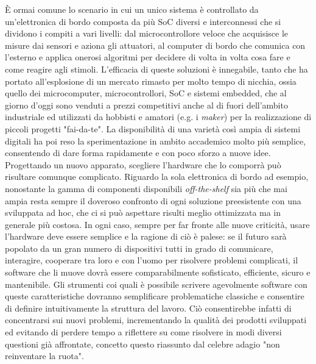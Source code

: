 È ormai comune lo scenario in cui un unico sistema è controllato da un'elettronica di bordo composta da più SoC diversi e interconnessi che si dividono i compiti a vari livelli: dal microcontrollore veloce che acquisisce le misure dai sensori e aziona gli attuatori, al computer di bordo che comunica con l'esterno e applica onerosi algoritmi per decidere di volta in volta cosa fare e come reagire agli stimoli. L'efficacia di queste soluzioni è innegabile, tanto che ha portato all'esplosione di un mercato rimasto per molto tempo di nicchia, ossia quello dei microcomputer, microcontrollori, SoC e sistemi embedded, che al giorno d'oggi sono venduti a prezzi competitivi anche al di fuori dell'ambito industriale ed utilizzati da hobbisti e amatori (e.g. i \emph{maker}) per la realizzazione di piccoli progetti "fai-da-te". La disponibilità di una varietà così ampia di sistemi digitali ha poi reso la sperimentazione in ambito accademico molto più semplice, consentendo di dare forma rapidamente e con poco sforzo a nuove idee.\\
Progettando un nuovo apparato, scegliere l'hardware che lo comporrà può risultare comunque complicato. Riguardo la sola elettronica di bordo ad esempio, nonostante la gamma di componenti disponibili \emph{off-the-shelf} sia più che mai ampia resta sempre il doveroso confronto di ogni soluzione preesistente con una sviluppata ad hoc, che ci si può aspettare risulti meglio ottimizzata ma in generale più costosa. In ogni caso, sempre per far fronte alle nuove criticità, usare l'hardware deve essere semplice e la ragione di ciò è palese: se il futuro sarà popolato da un gran numero di dispositivi tutti in grado di comunicare, interagire, cooperare tra loro e con l'uomo per risolvere problemi complicati, il software che li muove dovrà essere comparabilmente sofisticato, efficiente, sicuro e mantenibile. Gli strumenti coi quali è possibile scrivere agevolmente software con queste caratteristiche dovranno semplificare problematiche classiche e consentire di definire intuitivamente la struttura del lavoro. Ciò consentirebbe infatti di concentrarsi sui nuovi problemi, incrementando la qualità dei prodotti sviluppati ed evitando di perdere tempo a riflettere su come risolvere in modi diversi questioni già affrontate, concetto questo riassunto dal celebre adagio "non reinventare la ruota".\newpage

